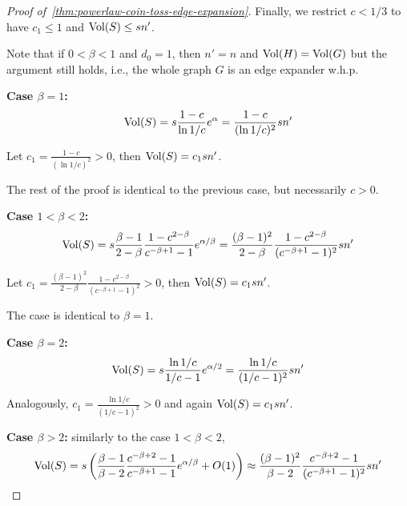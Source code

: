\begin{proof}[Proof of~\autoref{thm:powerlaw-coin-toss-edge-expansion}]
    Finally, we restrict $c<1/3$ to have $c_1\leq1$ and $\operatorname*{Vol}(S)\leq sn'$.
    
    Note that if $0<\beta<1$ and $d_0=1$, then $n'=n$ and $\operatorname*{Vol}(H)=\operatorname*{Vol}(G)$ but the argument still holds,
    i.e., the whole graph $G$ is an edge expander w.h.p.
    
    \textbf{Case $\beta=1$:}
    \begin{equation*}
        \operatorname*{Vol}(S)=s\frac{1-c}{\ln 1/c}e^\alpha=\frac{1-c}{(\ln 1/c)^2}sn'
    \end{equation*}
    
    Let $c_1=\frac{1-c}{(\ln 1/c)^2}>0$, then $\operatorname*{Vol}(S)=c_1sn'$.
    
    The rest of the proof is identical to the previous case, but necessarily $c>0$.
    
    \textbf{Case $1<\beta<2$:}
    \begin{equation*}
        \operatorname*{Vol}(S)=s\frac{\beta-1}{2-\beta}\frac{1-c^{2-\beta}}{c^{-\beta+1}-1}e^{\alpha/\beta}
        =\frac{(\beta-1)^2}{2-\beta}\frac{1-c^{2-\beta}}{(c^{-\beta+1}-1)^2}sn'
    \end{equation*}
    
    Let $c_1=\frac{(\beta-1)^2}{2-\beta}\frac{1-c^{2-\beta}}{(c^{-\beta+1}-1)^2}>0$,
    then $\operatorname*{Vol}(S)=c_1sn'$.
    
    The case is identical to $\beta=1$.
    
    \textbf{Case $\beta=2$:}
    \begin{equation*}
        \operatorname*{Vol}(S)=s\frac{\ln 1/c}{1/c-1}e^{\alpha/2}
        =\frac{\ln 1/c}{(1/c-1)^2}sn'
    \end{equation*}
    
    Analogously, $c_1=\frac{\ln 1/c}{(1/c-1)^2}>0$ and again $\operatorname*{Vol}(S)=c_1sn'$.
    
    \textbf{Case $\beta>2$:}
    similarly to the case $1<\beta<2$,
    \begin{equation*}
        \operatorname*{Vol}(S)=s\left(\frac{\beta-1}{\beta-2}\frac{c^{-\beta+2}-1}{c^{-\beta+1}-1}e^{\alpha/\beta}+O(1)\right)
        \approx\frac{(\beta-1)^2}{\beta-2}\frac{c^{-\beta+2}-1}{(c^{-\beta+1}-1)^2}sn'
    \end{equation*}


\end{proof}
